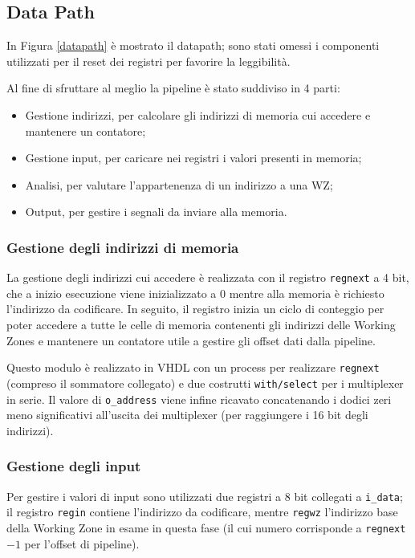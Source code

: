 
\subsection{Data Path}
In Figura \ref{datapath} \`e mostrato il datapath; sono stati omessi i componenti utilizzati per il reset dei registri per favorire la leggibilit\`a.

Al fine di sfruttare al meglio la pipeline \`e stato suddiviso in 4 parti: 
\begin{itemize}
	\item Gestione indirizzi, per calcolare gli indirizzi di memoria cui accedere
	e mantenere un contatore;
	\item  Gestione input, per caricare nei registri i valori presenti in memoria;
	\item Analisi, per valutare l'appartenenza di un indirizzo a una WZ;
	\item Output, per gestire i segnali da inviare alla memoria.	
\end{itemize}

\subsubsection{Gestione degli indirizzi di memoria}

La gestione degli indirizzi cui accedere \`e realizzata con il registro \texttt{regnext} a 4 bit, che a inizio esecuzione viene inizializzato a 0 mentre alla memoria \`e richiesto l'indirizzo da codificare. In seguito, il registro inizia un ciclo di conteggio per poter accedere a tutte le celle di memoria contenenti gli indirizzi delle Working Zones e mantenere un contatore utile a gestire gli offset dati dalla pipeline.

Questo modulo \`e realizzato in VHDL con un process per realizzare \texttt{regnext} (compreso il sommatore collegato) e due costrutti \texttt{with/select} per i multiplexer in serie. Il valore di \texttt{o\_address} viene infine ricavato concatenando i dodici zeri meno significativi all'uscita dei multiplexer (per raggiungere i 16 bit degli indirizzi).

\subsubsection{Gestione degli input}

Per gestire i valori di input sono utilizzati due registri a 8 bit collegati a \texttt{i\_data}; il registro \texttt{regin} contiene l'indirizzo da codificare, mentre \texttt{regwz} l'indirizzo base della Working Zone in esame in questa fase (il cui numero corrisponde a \texttt{regnext}$ - 1$ per l'offset di pipeline).

